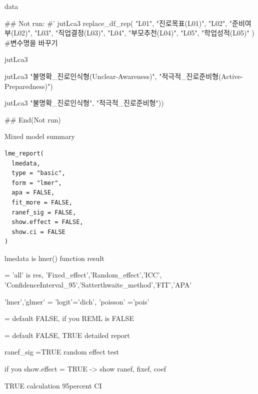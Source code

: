 \documentclass[a4paper]{book}
\begin{document}
%
\begin{Value}
data
\end{Value}
%
\begin{Examples}
\begin{ExampleCode}
## Not run: 
#'
jutLca3 %
  replace_df_rep( "L01", "진로목표(L01)",
                  "L02", "준비여부(L02)",
                  "L03", "직업결정(L03)",
                  "L04", "부모추천(L04)",
                  "L05", "학업성적(L05)" ) #변수명을 바꾸기

jutLca3 %

jutLca3 %
                                   "불명확_진로인식형\n(Unclear-Awareness)",
                                   "적극적_진로준비형\n(Active-Preparedness)")


                      jutLca3 %
                                                         "불명확_진로인식형",
                                                         "적극적_진로준비형"))


## End(Not run)
\end{ExampleCode}
\end{Examples}
%
\begin{Description}
Mixed model summary
\end{Description}
%
\begin{Usage}
\begin{verbatim}
lme_report(
  lmedata,
  type = "basic",
  form = "lmer",
  apa = FALSE,
  fit_more = FALSE,
  ranef_sig = FALSE,
  show.effect = FALSE,
  show.ci = FALSE
)
\end{verbatim}
\end{Usage}
%
\begin{Arguments}
\begin{ldescription}
\item[\code{lmedata}] lmedata is lmer() function result

\item[\code{type}] = 'all' is res, 'Fixed\_effect','Random\_effect','ICC', 'ConfidenceInterval\_95','Satterthwaite\_method','FIT','APA'

\item[\code{form}] 'lmer','glmer' = 'logit'='dich', 'poisson' ='pois'

\item[\code{apa}] = default FALSE, if you  REML is FALSE

\item[\code{fit\_more}] = default FALSE, TRUE detailed report

\item[\code{ranef\_sig}] ranef\_sig =TRUE  random effect test

\item[\code{show.effect}] if you show.effect = TRUE -> show ranef, fixef, coef

\item[\code{show.ci}] TRUE calculation 95percent CI
\end{ldescription}
\end{Arguments}
\end{document}
